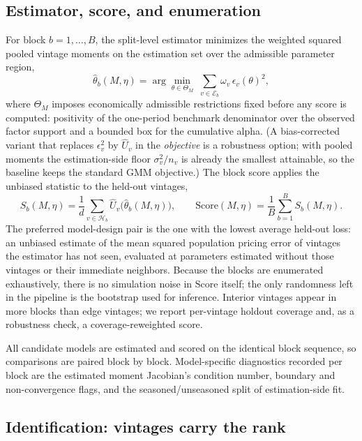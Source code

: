 \documentclass[11pt]{article}
\begin{document}
\subsection{Estimator, score, and enumeration}
\label{sec:estimator}

For block \(b=1,\dots,B\), the split-level estimator minimizes the weighted squared pooled vintage moments on the estimation set over the admissible parameter region,
\[
\hat\theta_b(M,\eta)
=
\arg\min_{\theta\in\Theta_M}\;
\sum_{v\in\mathcal E_b}\omega_v\,\epsilon_v(\theta)^2 ,
\]
where \(\Theta_M\) imposes economically admissible restrictions fixed before any score is computed: positivity of the one-period benchmark denominator over the observed factor support and a bounded box for the cumulative alpha. (A bias-corrected variant that replaces \(\epsilon_v^2\) by \(\widehat U_v\) in the \emph{objective} is a robustness option; with pooled moments the estimation-side floor \(\sigma_v^2/n_v\) is already the smallest attainable, so the baseline keeps the standard GMM objective.) The block score applies the unbiased statistic to the held-out vintages,
\[
S_b(M,\eta)
=
\frac{1}{d}\sum_{v\in\mathcal H_b}\widehat U_v\bigl(\hat\theta_b(M,\eta)\bigr),
\qquad
\mathrm{Score}(M,\eta)
=
\frac{1}{B}\sum_{b=1}^{B} S_b(M,\eta).
\]
The preferred model-design pair is the one with the lowest average held-out loss: an unbiased estimate of the mean squared population pricing error of vintages the estimator has not seen, evaluated at parameters estimated without those vintages or their immediate neighbors. Because the blocks are enumerated exhaustively, there is no simulation noise in \(\mathrm{Score}\) itself; the only randomness left in the pipeline is the bootstrap used for inference. Interior vintages appear in more blocks than edge vintages; we report per-vintage holdout coverage and, as a robustness check, a coverage-reweighted score.

All candidate models are estimated and scored on the identical block sequence, so comparisons are paired block by block. Model-specific diagnostics recorded per block are the estimated moment Jacobian's condition number, boundary and non-convergence flags, and the seasoned/unseasoned split of estimation-side fit.

\subsection{Identification: vintages carry the rank}
\label{sec:identification_rank}
\end{document}
